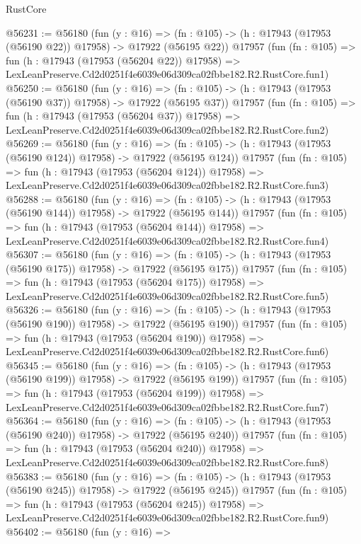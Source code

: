 \begin{lexlean}{RustCore}
\begin{coremodule}
@56231 := @56180
    (fun (y : @16) =>
    (fn : @105) -> (h : @17943 (@17953 (@56190 @22)) @17958) -> @17922 (@56195 @22))
    @17957
    (fun (fn : @105) =>
    fun (h : @17943 (@17953 (@56204 @22)) @17958) =>
    LexLeanPreserve.Cd2d0251f4e6039e06d309ca02fbbe182.R2.RustCore.fun1)
@56250 := @56180
    (fun (y : @16) =>
    (fn : @105) -> (h : @17943 (@17953 (@56190 @37)) @17958) -> @17922 (@56195 @37))
    @17957
    (fun (fn : @105) =>
    fun (h : @17943 (@17953 (@56204 @37)) @17958) =>
    LexLeanPreserve.Cd2d0251f4e6039e06d309ca02fbbe182.R2.RustCore.fun2)
@56269 := @56180
    (fun (y : @16) =>
    (fn : @105) -> (h : @17943 (@17953 (@56190 @124)) @17958) -> @17922 (@56195 @124))
    @17957
    (fun (fn : @105) =>
    fun (h : @17943 (@17953 (@56204 @124)) @17958) =>
    LexLeanPreserve.Cd2d0251f4e6039e06d309ca02fbbe182.R2.RustCore.fun3)
@56288 := @56180
    (fun (y : @16) =>
    (fn : @105) -> (h : @17943 (@17953 (@56190 @144)) @17958) -> @17922 (@56195 @144))
    @17957
    (fun (fn : @105) =>
    fun (h : @17943 (@17953 (@56204 @144)) @17958) =>
    LexLeanPreserve.Cd2d0251f4e6039e06d309ca02fbbe182.R2.RustCore.fun4)
@56307 := @56180
    (fun (y : @16) =>
    (fn : @105) -> (h : @17943 (@17953 (@56190 @175)) @17958) -> @17922 (@56195 @175))
    @17957
    (fun (fn : @105) =>
    fun (h : @17943 (@17953 (@56204 @175)) @17958) =>
    LexLeanPreserve.Cd2d0251f4e6039e06d309ca02fbbe182.R2.RustCore.fun5)
@56326 := @56180
    (fun (y : @16) =>
    (fn : @105) -> (h : @17943 (@17953 (@56190 @190)) @17958) -> @17922 (@56195 @190))
    @17957
    (fun (fn : @105) =>
    fun (h : @17943 (@17953 (@56204 @190)) @17958) =>
    LexLeanPreserve.Cd2d0251f4e6039e06d309ca02fbbe182.R2.RustCore.fun6)
@56345 := @56180
    (fun (y : @16) =>
    (fn : @105) -> (h : @17943 (@17953 (@56190 @199)) @17958) -> @17922 (@56195 @199))
    @17957
    (fun (fn : @105) =>
    fun (h : @17943 (@17953 (@56204 @199)) @17958) =>
    LexLeanPreserve.Cd2d0251f4e6039e06d309ca02fbbe182.R2.RustCore.fun7)
@56364 := @56180
    (fun (y : @16) =>
    (fn : @105) -> (h : @17943 (@17953 (@56190 @240)) @17958) -> @17922 (@56195 @240))
    @17957
    (fun (fn : @105) =>
    fun (h : @17943 (@17953 (@56204 @240)) @17958) =>
    LexLeanPreserve.Cd2d0251f4e6039e06d309ca02fbbe182.R2.RustCore.fun8)
@56383 := @56180
    (fun (y : @16) =>
    (fn : @105) -> (h : @17943 (@17953 (@56190 @245)) @17958) -> @17922 (@56195 @245))
    @17957
    (fun (fn : @105) =>
    fun (h : @17943 (@17953 (@56204 @245)) @17958) =>
    LexLeanPreserve.Cd2d0251f4e6039e06d309ca02fbbe182.R2.RustCore.fun9)
@56402 := @56180
    (fun (y : @16) =>

\end{coremodule}
\end{lexlean}
